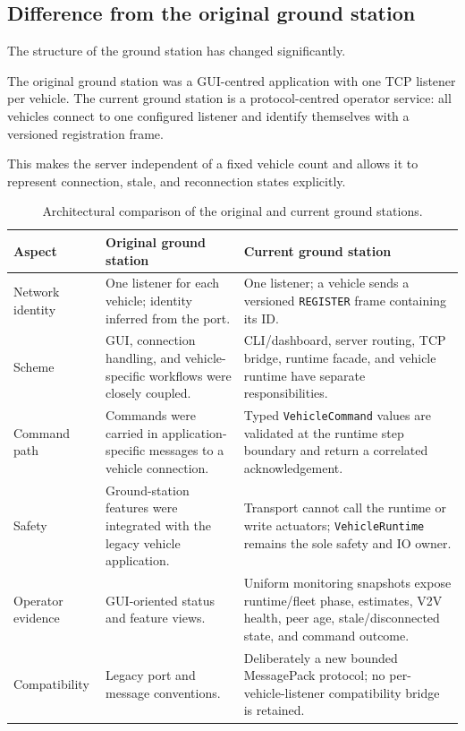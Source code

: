 \documentclass[11pt,a4paper]{article}
\begin{document}
\subsection{Difference from the original ground station}
The structure of the ground station has changed significantly.

The original ground station was a GUI-centred application with one TCP listener per vehicle. The current ground station is a protocol-centred operator service: all vehicles connect to one configured listener and identify themselves with a versioned registration frame.

This makes the server independent of a fixed vehicle count and allows it to represent connection, stale, and reconnection states explicitly.

\begin{table}[H]
\centering\tiny
\setlength{\tabcolsep}{2pt}
\begin{tabular}{@{}p{1.5cm}p{3cm}p{3.5cm}@{}}
\toprule
\textbf{Aspect} & \textbf{Original ground station} & \textbf{Current ground station}\\
\midrule
Network identity & One listener for each vehicle; identity inferred from the port. & One listener; a vehicle sends a versioned \texttt{REGISTER} frame containing its ID.\\
Scheme & GUI, connection handling, and vehicle-specific workflows were closely coupled. & CLI/dashboard, server routing, TCP bridge, runtime facade, and vehicle runtime have separate responsibilities.\\
Command path & Commands were carried in application-specific messages to a vehicle connection. & Typed \texttt{VehicleCommand} values are validated at the runtime step boundary and return a correlated acknowledgement.\\
Safety & Ground-station features were integrated with the legacy vehicle application. & Transport cannot call the runtime or write actuators; \texttt{VehicleRuntime} remains the sole safety and IO owner.\\
Operator evidence & GUI-oriented status and feature views. & Uniform monitoring snapshots expose runtime/fleet phase, estimates, V2V health, peer age, stale/disconnected state, and command outcome.\\
Compatibility & Legacy port and message conventions. & Deliberately a new bounded MessagePack protocol; no per-vehicle-listener compatibility bridge is retained.\\
\bottomrule
\end{tabular}
\caption{Architectural comparison of the original and current ground stations.}
\label{tab:ground-station-comparison}
\end{table}
\end{document}
